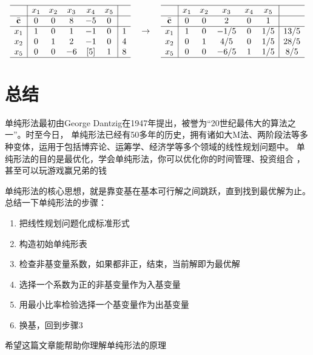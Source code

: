 \documentclass{../mathnotes-art}
\renewcommand{\c}{\mathbf{c}}
\begin{document}
\[
    \begin{array}{c|*{5}{c}|c}
        \hline
        & x_1 & x_2 & x_3 & x_4 & x_5 &    \\ \hline
        \bar{\c} & 0  & 0  & 8   & -5   & 0   &    \\ \hline
        x_{1} & 1  & 0   & 1   & -1   & 0   & 1  \\
        x_{2} & 0  & 1   & 2   & -1   & 0   & 4  \\
        x_{5} & 0   & 0   & -6   & [5]   & 1   & 8 \\ \hline
    \end{array}
    \quad \to \quad
    \begin{array}{c|*{5}{c}|c}
        \hline
        & x_1 & x_2 & x_3 & x_4 & x_5 &    \\ \hline
        \bar{\c} & 0  & 0  & 2   & 0   & 1   &    \\ \hline
        x_{1} & 1  & 0   & -1/5   & 0   & 1/5   &
        13/5  \\
        x_{2} & 0  & 1   & 4/5   & 0   & 1/5   &
        28/5  \\
        x_{5} & 0   & 0   & -6/5   & 1   & 1/5   &
        8/5 \\ \hline
    \end{array}
\]
\section{总结}

单纯形法最初由George Dantzig在1947年提出，被誉为“20世纪最伟大的算法之一”。时至今日，
单纯形法已经有50多年的历史，拥有诸如大M法、两阶段法等多种变体，运用于包括博弈论、运筹学、经济学等多个领域的线性规划问题中。
单纯形法的目的是最优化，学会单纯形法，你可以优化你的时间管理、投资组合
，甚至可以玩游戏赢兄弟的钱\cite[part2 p.~20]{GameTheory}

单纯形法的核心思想，就是靠变基在基本可行解之间跳跃，直到找到最优解为止。总结一下单纯形法的步骤：
\begin{enumerate}
    \item 把线性规划问题化成标准形式
    \item 构造初始单纯形表
    \item 检查非基变量系数，如果都非正，结束，当前解即为最优解
    \item 选择一个系数为正的非基变量作为入基变量
    \item 用最小比率检验选择一个基变量作为出基变量
    \item 换基，回到步骤3
\end{enumerate}

希望这篇文章能帮助你理解单纯形法的原理

\printbibliography[heading=bibintoc,title={参考}]
\end{document}
